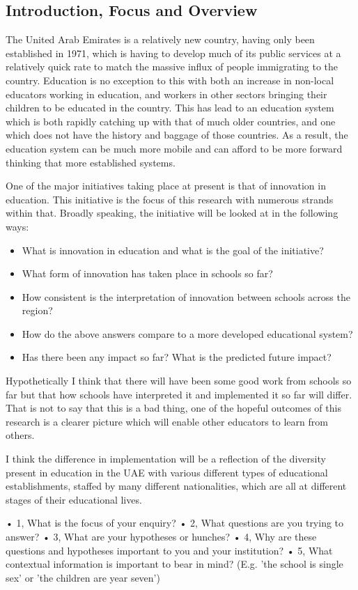 \subsection{Introduction, Focus and Overview}

The United Arab Emirates is a relatively new country, having only been established in 1971, which is having to develop much of its public services at a relatively quick rate to match the massive influx of people immigrating to the country. Education is no exception to this with both an increase in non-local educators working in education, and workers in other sectors bringing their children to be educated in the country. This has lead to an education system which is both rapidly catching up with that of much older countries, and one which does not have the history and baggage of those countries. As a result, the education system can be much more mobile and can afford to be more forward thinking that more established systems. 

One of the major initiatives taking place at present is that of innovation in education. This initiative is the focus of this research with numerous strands within that. Broadly speaking, the initiative will be looked at in the following ways: 

\begin{itemize}
\item What is innovation in education and what is the goal of the initiative?
\item What form of innovation has taken place in schools so far?
\item How consistent is the interpretation of innovation between schools across the region?
\item How do the above answers compare to a more developed educational system?
\item Has there been any impact so far? What is the predicted future impact?

\end{itemize}

Hypothetically I think that there will have been some good work from schools so far but that how schools have interpreted it and implemented it so far will differ. That is not to say that this is a bad thing, one of the hopeful outcomes of this research is a clearer picture which will enable other educators to learn from others.

I think the difference in implementation will be a reflection of the diversity present in education in the UAE with various different types of educational establishments, staffed by many different nationalities, which are all at different stages of their educational lives.

•	1, What is the focus of your enquiry?
•	2, What questions are you trying to answer?
•	3, What are your hypotheses or hunches?
•	4, Why are these questions and hypotheses important to you and your institution?
•	5, What contextual information is important to bear in mind? (E.g. 'the school is single sex' or 'the children are year seven')